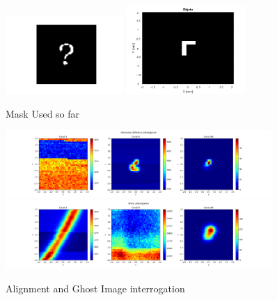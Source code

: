 \documentclass[xcolor=dvipsnames]{beamer}
\begin{document}
\begin{frame}
\begin{figure}
 \centering

{  \includegraphics[width=0.4\textwidth]{pictures/interrogation.png} }
{  \includegraphics[width=0.4\textwidth]{pictures/L.png} }
\caption{Mask Used so far}
 \label{n1}
\end{figure}
\end{frame}

\begin{frame}
\begin{figure}
 \centering

{  \includegraphics[width=0.9\textwidth]{pictures/Ubicacion_Definitiva_Interrogacion.png} }
{  \includegraphics[width=0.9\textwidth]{pictures/Ghost_interrogation.png} }
\caption{Alignment and Ghost Image interrogation}
 \label{n1}
\end{figure}
\end{frame}
\end{document}
